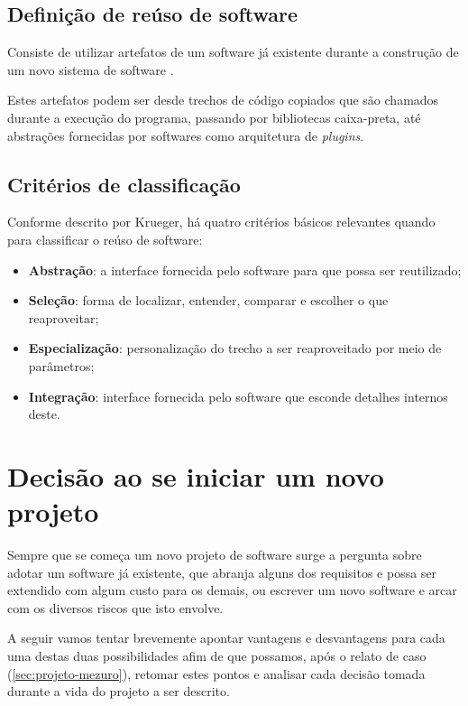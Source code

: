\documentclass[12pt]{article}
\begin{document}
  \subsection{Definição de reúso de software} \label{subsec:definicaoreuso}
  Consiste de utilizar artefatos de um software já existente durante a construção de um novo sistema de software \cite{k92}.

  Estes artefatos podem ser desde trechos de código copiados que são chamados durante a execução do programa, passando por bibliotecas caixa-preta, até abstrações fornecidas por softwares como arquitetura de \textit{plugins}.

  \subsection{Critérios de classificação} \label{subsec:criteriosclassificacao}
  Conforme descrito por Krueger, há quatro critérios básicos relevantes quando para classificar o reúso de software:

  \begin{itemize}
    \item \textbf{Abstração}: a interface fornecida pelo software para que possa ser reutilizado;
    \item \textbf{Seleção}: forma de localizar, entender, comparar e escolher o que reaproveitar;
    \item \textbf{Especialização}: personalização do trecho a ser reaproveitado por meio de parâmetros;
    \item \textbf{Integração}: interface fornecida pelo software que esconde detalhes internos deste.
  \end{itemize}

\section{Decisão ao se iniciar um novo projeto} \label{sec:decisao}
Sempre que se começa um novo projeto de software surge a pergunta sobre adotar um software já existente, que abranja alguns dos requisitos e possa ser extendido com algum custo para os demais, ou escrever um novo software e arcar com os diversos riscos que isto envolve.

A seguir vamos tentar brevemente apontar vantagens e desvantagens para cada uma destas duas possibilidades afim de que possamos, após o relato de caso (\ref{sec:projeto-mezuro}), retomar estes pontos e analisar cada decisão tomada durante a vida do projeto a ser descrito.
\end{document}
